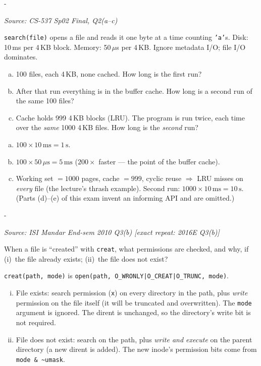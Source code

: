 \documentclass[11pt,a4paper]{article}
\makeatletter
\newcommand{\keepspace}[1]{\par\penalty-100\begingroup
  \setlength{\dimen@}{#1}\dimen@ii\pagegoal\advance\dimen@ii-\pagetotal
  \ifdim\dimen@>\dimen@ii\ifdim\dimen@ii>\z@\vfil\fi\break\fi\endgroup}
\newcounter{qn}[section]
\newenvironment{Qn}[4]{%
  \refstepcounter{qn}\keepspace{7\baselineskip}%
  \begin{tcolorbox}[qboxstyle, title={Q\thesection.\theqn\ \ [#1 \textbar\ #2]\ \ #4}]%
  {\footnotesize\color{g3}\textit{Source: #3}}\par\smallskip%
}{%
  \end{tcolorbox}%
}
\newenvironment{Sol}{%
  \begin{tcolorbox}[sboxstyle, title={Solution}]%
}{%
  \end{tcolorbox}\vspace{0.35em}%
}
\makeatother
\begin{document}
\begin{Qn}{Medium}{Lect 24}{CS-537 Sp02 Final, Q2(a--c)}{Buffer-cache hit, miss, and LRU thrash}
\texttt{search(file)} opens a file and reads it one byte at a time
counting \texttt{'a'}s. Disk: 10\,ms per 4\,KB block. Memory: 50\,$\mu$s
per 4\,KB. Ignore metadata I/O; file I/O dominates.
\begin{enumerate}[(a)]
\item 100 files, each 4\,KB, none cached. How long is the first run?
\item After that run everything is in the buffer cache. How long is a
      second run of the same 100 files?
\item Cache holds 999 4\,KB blocks (LRU). The program is run twice,
      each time over the \emph{same} 1000 4\,KB files. How long is
      the \emph{second} run?
\end{enumerate}
\end{Qn}
\begin{Sol}
\begin{enumerate}[(a)]
\item $100\times 10\,\mathrm{ms} = 1\,\mathrm{s}$.
\item $100\times 50\,\mu\mathrm{s} = 5\,\mathrm{ms}$
      ($200\times$ faster --- the point of the buffer cache).
\item Working set $=1000$ pages, cache $=999$, cyclic reuse $\Rightarrow$
      LRU misses on \emph{every} file (the lecture's thrash example).
      Second run: $1000\times 10\,\mathrm{ms} = 10\,\mathrm{s}$.
      (Parts (d)--(e) of this exam invent an informing API and are
      omitted.)
\end{enumerate}
\end{Sol}

\begin{Qn}{Medium}{Lect 23}{ISI Mandar End-sem 2010 Q3(b) [exact repeat: 2016E Q3(b)]}{\texttt{creat}: which permissions, existing vs new?}
When a file is ``created'' with \texttt{creat}, what permissions are
checked, and why, if (i)~the file already exists; (ii)~the file does
not exist?
\end{Qn}
\begin{Sol}
\texttt{creat(path, mode)} is \texttt{open(path, O\_WRONLY|O\_CREAT|O\_TRUNC, mode)}.
\begin{enumerate}[(i)]
\item File exists: search permission (\texttt{x}) on every directory
      in the path, plus \emph{write} permission on the file itself
      (it will be truncated and overwritten). The \texttt{mode}
      argument is ignored. The dirent is unchanged, so the
      directory's write bit is not required.
\item File does not exist: search on the path, plus \emph{write and
      execute} on the parent directory (a new dirent is added). The
      new inode's permission bits come from \texttt{mode \& \~{}umask}.
\end{enumerate}
\end{Sol}
\end{document}
